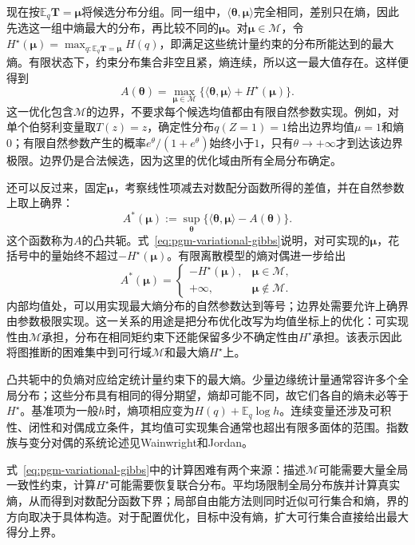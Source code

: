 现在按$\mathbb E_q\bm T=\bm\mu$将候选分布分组。同一组中，$\langle\bm\theta,\bm\mu\rangle$完全相同，差别只在熵，因此先选这一组中熵最大的分布，再比较不同的$\bm\mu$。对$\bm\mu\in\mathcal M$，令$H^\star(\bm\mu)=\max_{q:\mathbb E_q\bm T=\bm\mu}H(q)$，即满足这些统计量约束的分布所能达到的最大熵。有限状态下，约束分布集合非空且紧，熵连续，所以这一最大值存在。这样便得到
\begin{equation}
  A(\bm\theta)=\max_{\bm\mu\in\mathcal M}
    \{\langle\bm\theta,\bm\mu\rangle+H^\star(\bm\mu)\}.
  \label{eq:pgm-variational-gibbs}
\end{equation}
这一优化包含$\mathcal M$的边界，不要求每个候选均值都由有限自然参数实现。例如，对单个伯努利变量取$T(z)=z$，确定性分布$q(Z=1)=1$给出边界均值$\mu=1$和熵$0$；有限自然参数产生的概率$e^\theta/(1+e^\theta)$始终小于$1$，只有$\theta\to+\infty$才到达该边界极限。边界仍是合法候选，因为这里的优化域由所有全局分布确定。

还可以反过来，固定$\bm\mu$，考察线性项减去对数配分函数所得的差值，并在自然参数上取上确界：
\[
  A^*(\bm\mu)
    :=\sup_{\bm\theta}
          \{\langle\bm\theta,\bm\mu\rangle-A(\bm\theta)\}.
\]
这个函数称为$A$的凸共轭。式~\eqref{eq:pgm-variational-gibbs}说明，对可实现的$\bm\mu$，花括号中的量始终不超过$-H^\star(\bm\mu)$。有限离散模型的熵对偶进一步给出
\[
  A^*(\bm\mu)=
    \begin{cases}
      -H^\star(\bm\mu),&\bm\mu\in\mathcal M,\\
      +\infty,&\bm\mu\notin\mathcal M.
    \end{cases}
\]
内部均值处，可以用实现最大熵分布的自然参数达到等号；边界处需要允许上确界由参数极限实现。这一关系的用途是把分布优化改写为均值坐标上的优化：可实现性由$\mathcal M$承担，分布在相同矩约束下还能保留多少不确定性由$H^\star$承担。该表示因此将图推断的困难集中到可行域$\mathcal M$和最大熵$H^\star$上。

凸共轭中的负熵对应给定统计量约束下的最大熵。少量边缘统计量通常容许多个全局分布；这些分布具有相同的得分期望，熵却可能不同，故它们各自的熵未必等于$H^\star$。基准项为一般$h$时，熵项相应变为$H(q)+\mathbb E_q\log h$。连续变量还涉及可积性、闭性和对偶成立条件，其均值可实现集合通常也超出有限多面体的范围。指数族与变分对偶的系统论述见Wainwright和Jordan。

式~\eqref{eq:pgm-variational-gibbs}中的计算困难有两个来源：描述$\mathcal M$可能需要大量全局一致性约束，计算$H^\star$可能需要恢复联合分布。平均场限制全局分布族并计算真实熵，从而得到对数配分函数下界；局部自由能方法则同时近似可行集合和熵，界的方向取决于具体构造。对于配置优化，目标中没有熵，扩大可行集合直接给出最大得分上界。

